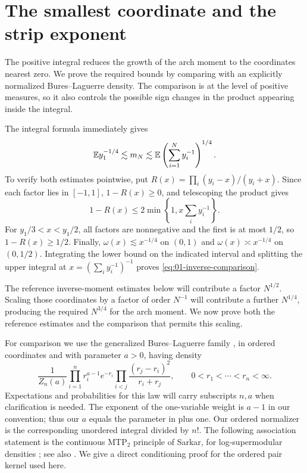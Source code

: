 \section{The smallest coordinate and the strip exponent}\label{sec:hard-edge}

The positive integral reduces the growth of the arch moment to the coordinates nearest zero. We prove the required bounds by comparing with an explicitly normalized Bures--Laguerre density. The comparison is at the level of positive measures, so it also controls the possible sign changes in the product appearing inside the integral.


The integral formula immediately gives
\begin{equation}\label{eq:01-inverse-comparison}
 \mathbb E y_1^{-1/4}\lesssim m_N
 \lesssim\mathbb E\left(\sum_{i=1}^Ny_i^{-1}\right)^{1/4}.
\end{equation}
To verify both estimates pointwise, put
$R(x)=\prod_i(y_i-x)/(y_i+x)$. Since each factor lies in $[-1,1]$,
$1-R(x)\ge0$, and telescoping the product gives
\[
 1-R(x)\le2\min\left\{1,x\sum_i y_i^{-1}\right\}.
\]
For $y_1/3<x<y_1/2$, all factors are nonnegative and the first is at
most $1/2$, so $1-R(x)\ge1/2$. Finally,
$\omega(x)\lesssim x^{-1/4}$ on $(0,1)$ and
$\omega(x)\asymp x^{-1/4}$ on $(0,1/2)$. Integrating the lower bound
on the indicated interval and splitting the upper integral at
$x=(\sum_i y_i^{-1})^{-1}$ proves
\eqref{eq:01-inverse-comparison}.

The reference inverse-moment estimates below will contribute a factor
$N^{1/2}$. Scaling those coordinates by a factor of order $N^{-1}$
will contribute a further $N^{1/4}$, producing the required $N^{3/4}$
for the arch moment. We now prove both the reference estimates and the
comparison that permits this scaling.

For comparison we use the generalized Bures--Laguerre family
\cite{ForresterKieburg2016}, in ordered coordinates and with parameter
$a>0$, having density
\begin{equation}\label{eq:01-Laguerre-law}
 \frac1{Z_n(a)}\prod_{i=1}^n r_i^{a-1}e^{-r_i}
          \prod_{i<j}\frac{(r_j-r_i)^2}{r_i+r_j},
 \qquad 0<r_1<\cdots<r_n<\infty.
\end{equation}
Expectations and probabilities for this law will carry subscripts
$n,a$ when clarification is needed.
The exponent of the one-variable weight is $a-1$ in our convention;
thus our $a$ equals the parameter in \cite[equation~(1.5)]{ForresterKieburg2016}
plus one. Our ordered normalizer is the corresponding unordered integral
divided by $n!$.
The following association statement is the continuous MTP$_2$ principle
of Sarkar, for log-supermodular densities
\cite[Theorem 2.27]{Bogso2014}; see also
\cite[equation (3.5)]{FallatEtAl2017}. We give a direct conditioning
proof for the ordered pair kernel used here.

